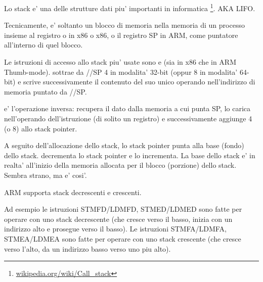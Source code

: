 \chapterold{\Stack}
\label{sec:stack}
\myindex{\Stack}

Lo stack e' una delle strutture dati piu' importanti in informatica
\footnote{\href{http://go.yurichev.com/17119}{wikipedia.org/wiki/Call\_stack}}.
\ac{AKA} \ac{LIFO}.

Tecnicamente, e' soltanto un blocco di memoria nella memoria di un processo insieme al registro \ESP o \RSP in x86 o x86, o il registro \ac{SP} in ARM, come puntatore all'interno di quel blocco.

Le istruzioni di accesso allo stack piu' usate sono \PUSH e \POP (sia in x86 che in ARM Thumb-mode).
\PUSH sottrae da \ESP/\RSP/\ac{SP} 4 in modalita' 32-bit (oppur 8 in modalita' 64-bit) e scrive successivamente il contenuto del suo unico operando nell'indirizzo di memoria puntato da \ESP/\RSP/\ac{SP}.

\POP e' l'operazione inversa: recupera il dato dalla memoria a cui punta \ac{SP}, lo carica nell'operando dell'istruzione (di solito un registro)
e successivamente aggiunge 4 (o 8) allo \gls{stack pointer}.

A seguito dell'allocazione dello stack, lo \gls{stack pointer} punta alla base (fondo) dello stack.
\PUSH decrementa lo \gls{stack pointer} e \POP lo incrementa.
La base dello stack e' in realta' all'inizio della memoria allocata per il blocco (porzione) dello stack. Sembra strano, ma e' cosi'.

ARM supporta stack decrescenti e crescenti.


Ad esempio le istruzioni \ac{STMFD}/\ac{LDMFD}, \ac{STMED}/\ac{LDMED} sono fatte per operare con uno stack decrescente (che cresce verso il basso, inizia con un indirizzo alto e prosegue verso il basso).
Le istruzioni \ac{STMFA}/\ac{LDMFA}, \ac{STMEA}/\ac{LDMEA} sono fatte per operare con uno stack crescente (che cresce verso l'alto, da un indirizzo basso verso uno piu alto).


